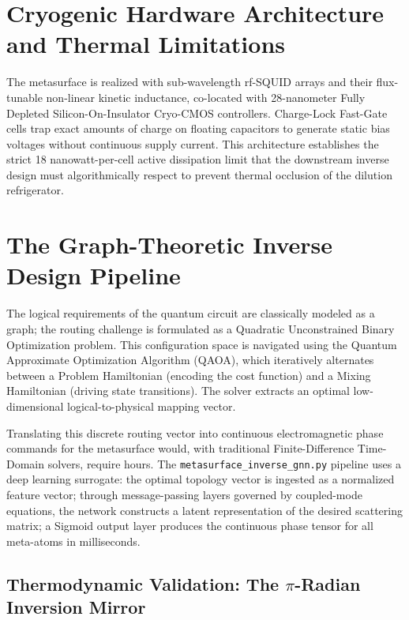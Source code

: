 \documentclass[11pt, a4paper]{article}
\begin{document}
\section{Cryogenic Hardware Architecture and Thermal Limitations}

The metasurface is realized with sub-wavelength rf-SQUID arrays and their flux-tunable non-linear kinetic inductance, co-located with 28-nanometer Fully Depleted Silicon-On-Insulator Cryo-CMOS controllers. Charge-Lock Fast-Gate cells trap exact amounts of charge on floating capacitors to generate static bias voltages without continuous supply current. This architecture establishes the strict 18 nanowatt-per-cell active dissipation limit that the downstream inverse design must algorithmically respect to prevent thermal occlusion of the dilution refrigerator.

\section{The Graph-Theoretic Inverse Design Pipeline}

The logical requirements of the quantum circuit are classically modeled as a graph; the routing challenge is formulated as a Quadratic Unconstrained Binary Optimization problem. This configuration space is navigated using the Quantum Approximate Optimization Algorithm (QAOA), which iteratively alternates between a Problem Hamiltonian (encoding the cost function) and a Mixing Hamiltonian (driving state transitions). The solver extracts an optimal low-dimensional logical-to-physical mapping vector.

Translating this discrete routing vector into continuous electromagnetic phase commands for the metasurface would, with traditional Finite-Difference Time-Domain solvers, require hours. The \texttt{metasurface\_inverse\_gnn.py} pipeline uses a deep learning surrogate: the optimal topology vector is ingested as a normalized feature vector; through message-passing layers governed by coupled-mode equations, the network constructs a latent representation of the desired scattering matrix; a Sigmoid output layer produces the continuous phase tensor for all meta-atoms in milliseconds.

\subsection{Thermodynamic Validation: The $\pi$-Radian Inversion Mirror}
\end{document}
